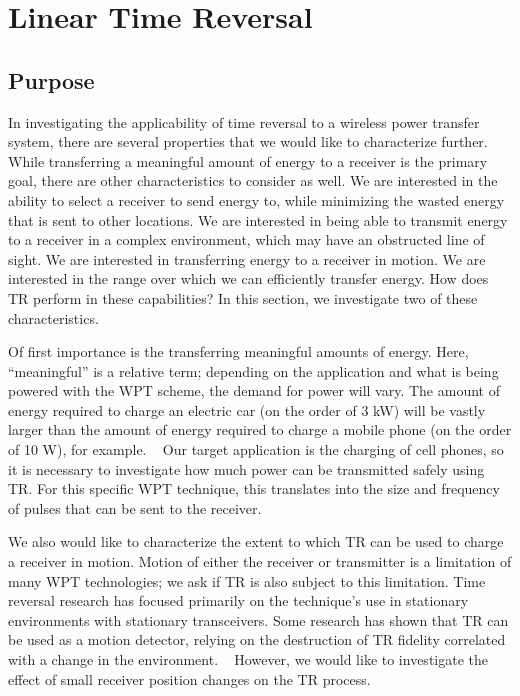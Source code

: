 \chapter{Linear Time Reversal}
\label{ch:ltr}

\section{Purpose}
\label{sec:ltr-purpose}

In investigating the applicability of time reversal to a wireless power transfer system, there are several properties that we would like to characterize further. While transferring a meaningful amount of energy to a receiver is the primary goal, there are other characteristics to consider as well. We are interested in the ability to select a receiver to send energy to, while minimizing the wasted energy that is sent to other locations. We are interested in being able to transmit energy to a receiver in a complex environment, which may have an obstructed line of sight. We are interested in transferring energy to a receiver in motion. We are interested in the range over which we can efficiently transfer energy. How does TR perform in these capabilities? In this section, we investigate two of these characteristics.

Of first importance is the transferring meaningful amounts of energy. Here, ``meaningful'' is a relative term; depending on the application and what is being powered with the WPT scheme, the demand for power will vary. The amount of energy required to charge an electric car (on the order of 3 kW) will be vastly larger than the amount of energy required to charge a mobile phone (on the order of 10 W), for example. ~\cite{witricity2013subsea} Our target application is the charging of cell phones, so it is necessary to investigate how much power can be transmitted safely using TR. For this specific WPT technique, this translates into the size and frequency of pulses that can be sent to the receiver.

We also would like to characterize the extent to which TR can be used to charge a receiver in motion. Motion of either the receiver or transmitter is a limitation of many WPT technologies; we ask if TR is also subject to this limitation. Time reversal research has focused primarily on the technique's use in stationary environments with stationary transceivers. Some research has shown that TR can be used as a motion detector, relying on the destruction of TR fidelity correlated with a change in the environment. ~\cite{taddese_sensing_2010} However, we would like to investigate the effect of small receiver position changes on the TR process.

